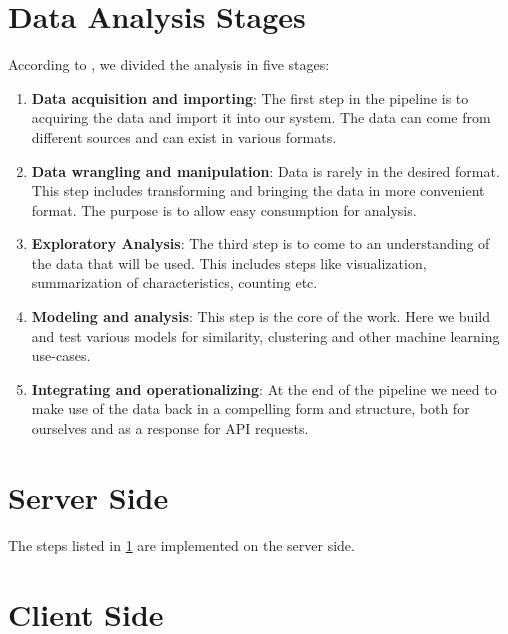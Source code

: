\section{Data Analysis Stages} \label{sec:steps}
According to \cite{Ojeda:2014:PDS:2721420}, we divided the analysis in five stages:
\begin{enumerate}
	\item \textbf{Data acquisition and importing}: 
	The first step in the pipeline is to acquiring the data and import it into our system. 
	The data can come from different sources and can exist in various formats.
	\item \textbf{Data wrangling and manipulation}: 
	Data is rarely in the desired format. 
	This step includes transforming and bringing the data in more convenient format.
	The purpose is to allow easy consumption for analysis.
	\item \textbf{Exploratory Analysis}: 
	The third step is to come to an understanding of the data that will be used. 
	This includes steps like visualization, summarization of characteristics, counting etc.
	\item \textbf{Modeling and analysis}: 
	This step is the core of the work. 
	Here we build and test various models for similarity, clustering and other machine learning use-cases.
	\item \textbf{Integrating and operationalizing}: 
	At the end of the pipeline we need to make use of the data back in a compelling form and structure,
	both for ourselves and as a response for API requests. 
\end{enumerate}

\section{Server Side}
The steps listed in \ref{sec:steps} are implemented on the server side.

\section{Client Side}